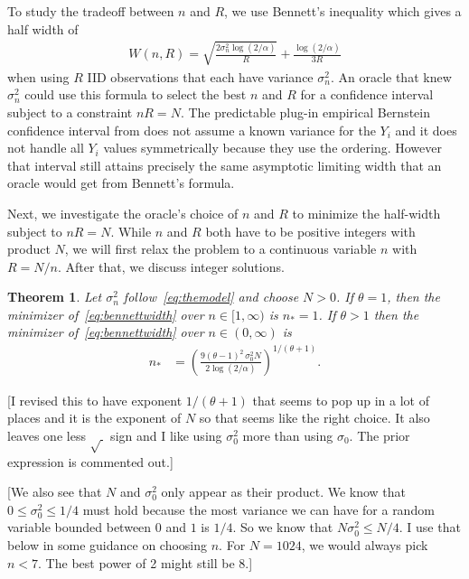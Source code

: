 \documentclass{article}
\newtheorem{theorem}{Theorem}
\newcommand{\art}[1]{\begingroup\color{blue}#1\endgroup}
\renewcommand{\le}{\leqslant}
\begin{document}
To study the tradeoff between $n$ and $R$, we use Bennett's 
inequality which gives a half width of
\begin{align}\label{eq:bennettwidth}
W(n,R)=\sqrt{\frac{2\sigma_n^2\log(2/\alpha)}R}
+ \frac{\log(2/\alpha)}{3R}
\end{align}
when using $R$ IID observations that each have variance
$\sigma^2_n$. An oracle that knew $\sigma^2_n$ could
use this formula to select the best $n$ and $R$
for a confidence interval subject to a constraint $nR=N$.
The predictable plug-in empirical Bernstein confidence interval
from \cite{WauRam24a} does not assume a known variance
for the $Y_i$ and it does not handle all $Y_i$ values
symmetrically because they use the ordering.  However
that interval still attains precisely the same asymptotic limiting width
that an oracle would get from Bennett's formula. 

Next, we investigate the oracle's choice of $n$ and $R$
to minimize the half-width subject to $nR=N$. 
While $n$ and $R$ both have to be positive integers
with product $N$, we will first relax the problem
to a continuous variable $n$ with $R=N/n$.  After that, we
discuss integer solutions.

\begin{theorem}\label{thm:goodn}
Let $\sigma^2_n$ follow~\eqref{eq:themodel} and choose $N>0$.
If $\theta=1$, then the minimizer of~\eqref{eq:bennettwidth} 
over $n\in[1,\infty)$ is $n_*=1$.
If $\theta>1$ then the minimizer of~\eqref{eq:bennettwidth}
over $n\in(0,\infty)$ is 
\begin{align}\label{eq:goodn}
n_*& 
 = 
\left(\frac{9(\theta-1)^2\,\sigma_0^2
N}{2\log(2/\alpha)}\right)^{1/(\theta+1)}.
\end{align}\end{theorem}
\art{[I revised this to have exponent $1/(\theta+1)$
that seems to pop up in a lot of places and it is the
exponent of $N$ so that seems like the right choice. It also
leaves one less $\sqrt{\ }$ sign and I like using $\sigma_0^2$ more
than using $\sigma_0$. The prior expression is commented out.]} 

\art{[We also see that $N$ and $\sigma^2_0$ only appear
as their product.  We know that $0\le\sigma_0^2\le1/4$ must hold because
the most variance we can have for a random variable bounded between
$0$ and $1$ is $1/4$. So we know that $N\sigma_0^2\le N/4$. I use that
below in some guidance on choosing $n$. For $N=1024$, we would
always pick $n<7$. The best power of 2 might still be $8$.]}
\end{document}
